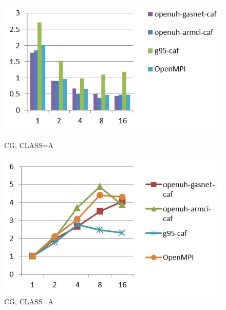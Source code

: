 \begin{figure}[ht]
\begin{minipage}[b]{0.45\linewidth}
\centering
\includegraphics[width=\textwidth]{./figures/cg_A_time.jpg}
\caption{CG, CLASS=A}
\label{fig:figure1}
\end{minipage}
\hspace{0.5cm}
\begin{minipage}[b]{0.45\linewidth}
\centering
\includegraphics[width=\textwidth]{./figures/cg_A_scalability.jpg}
\caption{CG, CLASS=A}
\label{fig:figure2}
\end{minipage}
\end{figure}




